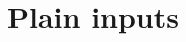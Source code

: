 \documentclass{article}
\newcommand\ins[1]{
	}
\begin{document}
	\ins{nonl1}
	\ins{count}
	\ins{nl1}
	\ins{count}
	\ins{nonlm}
	\ins{count}
	\ins{nlm}
	\ins{count}
\section{Plain inputs}








\end{document}
